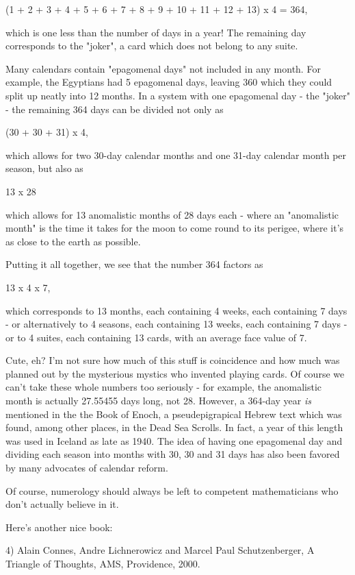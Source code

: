 (1 + 2 + 3 + 4 + 5 + 6 + 7 + 8 + 9 + 10 + 11 + 12 + 13) x 4 = 364,

which is one less than the number of days in a year!  The remaining day
corresponds to the "joker", a card which does not belong to any suite. 

Many calendars contain "epagomenal days" not included in any month.  
For example, the Egyptians had 5 epagomenal days, leaving 360 which they
could split up neatly into 12 months.  In a system with one epagomenal
day - the "joker" - the remaining 364 days can be divided not only as

(30 + 30 + 31) x 4,

which allows for two 30-day calendar months and one 31-day calendar 
month per season, but also as 

13 x 28

which allows for 13 anomalistic months of 28 days each - where an
"anomalistic month" is the time it takes for the moon to come round to
its perigee, where it's as close to the earth as possible.  

Putting it all together, we see that the number 364 factors as 

13 x 4 x 7,

which corresponds to 13 months, each containing 4 weeks, each containing
7 days - or alternatively to 4 seasons, each containing 13 weeks, each
containing 7 days - or to 4 suites, each containing 13 cards, with an
average face value of 7.  

Cute, eh?  I'm not sure how much of this stuff is coincidence and how
much was planned out by the mysterious mystics who invented playing
cards.   Of course we can't take these whole numbers too seriously - 
for example, the anomalistic month is actually 27.55455 days long, not
28.  However, a 364-day year \emph{is} mentioned in the the Book of Enoch, 
a pseudepigrapical Hebrew text which was found, among other places, in the 
Dead Sea Scrolls.  In fact, a year of this length was used in Iceland as 
late as 1940.  The idea of having one epagomenal day and dividing each 
season into months with 30, 30 and 31 days has also been favored by many
advocates of calendar reform.  

Of course, numerology should always be left to competent mathematicians
who don't actually believe in it.

Here's another nice book:

4) Alain Connes, Andre Lichnerowicz and Marcel Paul Schutzenberger,
A Triangle of Thoughts, AMS, Providence, 2000.  

